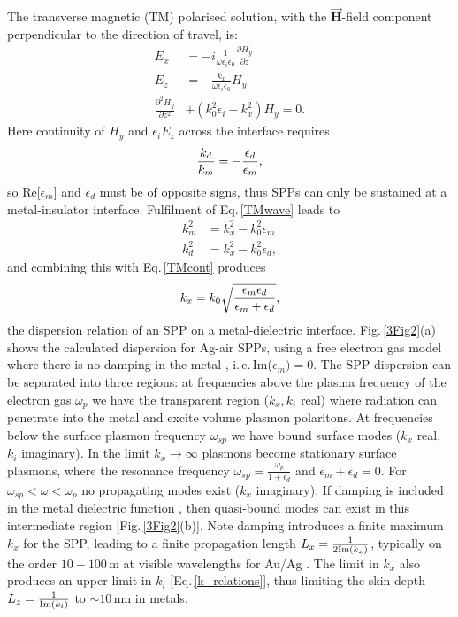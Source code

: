 The transverse magnetic (TM) polarised solution, with the $\vec{\mathbf{H}}$-field component perpendicular to the direction of travel, is:
\begin{subequations}
\label{TMplasmons}
\begin{align}
E_x &= -i \frac{1}{\omega \epsilon_i \epsilon_0} \frac{\partial H_y}{\partial z}\\
E_z &= -\frac{k_x}{\omega \epsilon_i \epsilon_0} H_y\\
\frac{\partial^2 H_y}{\partial z^2} &+ (k_0^2 \epsilon_i-k_x^2)H_y = 0 \label{TMwave}.
\end{align}
\end{subequations}
Here continuity of $H_y$ and $\epsilon_i E_z$ across the interface requires
\begin{equation}
\centering
\frac{k_d}{k_m} = -\frac{\epsilon_d}{\epsilon_m} ,
\label{TMcont}
\end{equation}
so Re[$\epsilon_m$] and $\epsilon_d$ must be of opposite signs, thus SPPs can only be sustained at a metal-insulator interface. Fulfilment of Eq.\,\ref{TMwave} leads to 
\begin{subequations}
\label{k_relations}
\begin{align}
k_m^2 &= k_x^2-k_0^2\epsilon_m\\
k_d^2 &= k_x^2-k_0^2\epsilon_d ,
\end{align}
\end{subequations}
and combining this with Eq.\,\ref{TMcont} produces
\begin{equation}
\centering
k_x = k_0\sqrt{\frac{\epsilon_m \epsilon_d}{\epsilon_m + \epsilon_d}} ,
\label{SPPdispersion}
\end{equation}
the dispersion relation of an SPP on a metal-dielectric interface. Fig.\,\ref{3Fig2}(a) shows the calculated dispersion for Ag-air SPPs, using a free electron gas model where there is no damping in the metal \cite{Zeman1987}, i.\,e.\,Im($\epsilon_m)=0$. The SPP dispersion can be separated into three regions: at frequencies above the plasma frequency of the electron gas $\omega_p$ we have the transparent region ($k_x, k_i$ real) where radiation can penetrate into the metal and excite volume plasmon polaritons. At frequencies below the surface plasmon frequency $\omega_{sp}$ we have bound surface modes ($k_x$ real, $k_i$ imaginary). In the limit $k_x\rightarrow \infty$ plasmons become stationary surface plasmons, where the resonance frequency $\omega_{sp} = \frac{\omega_p}{1+\epsilon_d}$ and $\epsilon_m+\epsilon_d=0$. For $\omega_{sp}<\omega<\omega_p$ no propagating modes exist ($k_x$ imaginary). If damping is included in the metal dielectric function \cite{Johnson1972}, then quasi-bound modes can exist in this intermediate region [Fig.\,\ref{3Fig2}(b)]. Note damping introduces a finite maximum $k_x$ for the SPP, leading to a finite propagation length $L_x = \frac{1}{2\textnormal{Im}(k_x)}$, typically on the order $10-100\,$\textmu m at visible wavelengths for Au/Ag \cite{Maier2007}. The limit in $k_x$ also produces an upper limit in $k_i$ [Eq.\,\ref{k_relations}], thus limiting the skin depth $L_z = \frac{1}{\textnormal{Im}(k_i)}$ to $\sim10$\,nm in metals. 
